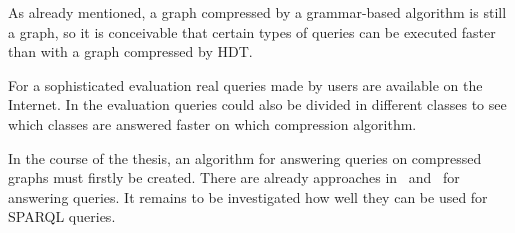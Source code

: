 \documentclass[a4paper]{scrartcl}
\begin{document}
As already mentioned, a graph compressed by a grammar-based algorithm is still a graph, so it is conceivable that certain types of queries can be executed faster than with a graph compressed by  HDT.

For a sophisticated evaluation real queries made by users are available on the Internet. In the evaluation queries could also be divided in different classes to see which classes are answered faster on which compression algorithm.

In the course of the thesis, an algorithm for answering queries on compressed graphs must firstly be created. There are already approaches in~\cite{maneth} and~\cite{mattdk} for answering queries. It remains to be investigated how well they can be used for SPARQL queries.


\pagebreak
\printbibliography
\end{document}
